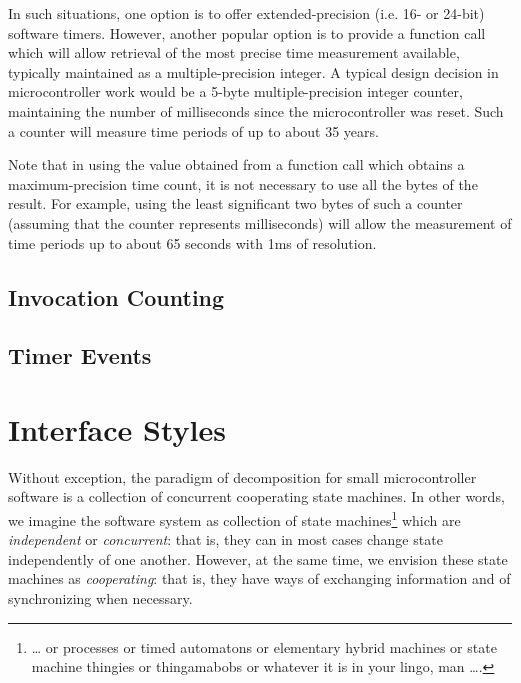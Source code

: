In such situations, one 
option is to offer extended-precision (i.e. 16- or 24-bit) software timers.
However, another popular option is to provide a function call which
will allow retrieval of the most precise time measurement available,
typically maintained as a multiple-precision integer.  A typical
design decision in microcontroller work would be a 5-byte multiple-precision
integer counter, maintaining the number of milliseconds since the 
microcontroller was reset.  Such a counter will measure time periods
of up to about 35 years.

Note that in using the value obtained from a function call
which obtains a maximum-precision time count, it is not
necessary to use all the bytes of the result.  For example,
using the least significant two bytes of such a counter
(assuming that the counter represents milliseconds) will
allow the measurement of time periods up to about 65 seconds
with 1ms of resolution.


\subsection{Invocation Counting}
\label{cpco0:smot0:sicn0}



\subsection{Timer Events}
\label{cpco0:smot0:stev0}



\section{Interface Styles}
\label{cpco0:sist0}

Without exception, the paradigm of decomposition for small microcontroller
software is a collection of concurrent cooperating state machines.  In other
words, we imagine
the software system as collection of state machines\footnote{\ldots{} or processes or 
timed automatons or elementary hybrid machines or state machine thingies
or thingamabobs or whatever it is in your lingo, man \ldots{}.} which are
\emph{independent} or \emph{concurrent}:  that is, they can in most 
cases change state independently
of one another.  However, at the same time, we envision these
state machines as \emph{cooperating}:  that is, they have ways 
of exchanging information and of synchronizing when necessary.


